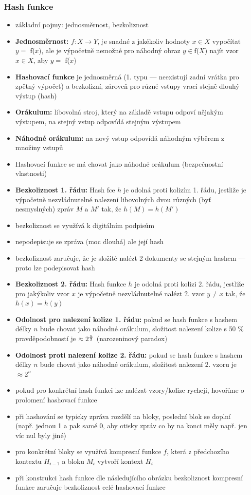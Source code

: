 \subsubsection*{Hash funkce}
\begin{itemize}
	\item základní pojmy: jednosměrnost, bezkoliznost
	\item \textbf{Jednosměrnost:} $f: X \rightarrow Y$, je snadné z jakékoliv hodnoty $x \in X$ vypočítat $y = $ f($x$), ale je výpočetně nemožné pro náhodný obraz $y \in $f($X$) najít vzor $x \in X$, aby $y = $ f($x$)
	\item \textbf{Hashovací funkce} je jednosměrná (1. typu --- neexistují zadní vrátka pro zpětný výpočet) a bezkolizní, zároveň pro různé vstupy vrací stejně dlouhý výstup (hash)
	\item \textbf{Orákulum:} libovolná stroj, který na základě vstupu odpoví nějakým výstupem, na stejný vstup odpovídá stejným výstupem
	\item \textbf{Náhodné orákulum:} na nový vstup odpovídá náhodným výběrem z množiny vstupů
	\item Hashovací funkce se má chovat jako náhodné orákulum (bezpečnostní vlastnosti)
	\item \textbf{Bezkoliznost 1. řádu:} Hash fce $h$ je odolná proti kolizím 1. řádu, jestliže je výpočetně nezvládnutelné nalezení libovolných dvou různých (byť nesmyslných) zpráv $M$ a $M'$ tak, že $h(M) = h(M')$
	\item bezkoliznost se využívá k digitálním podpisům
	\item nepodepisuje se zpráva (moc dlouhá) ale její hash
	\item bezkoliznost zaručuje, že je složité nalézt 2 dokumenty se stejným hashem --- proto lze podepisovat hash
	\item \textbf{Bezkoliznost 2. řádu:} Hash funkce $h$ je odolná proti kolizi 2. řádu, jestliže pro jakýkoliv vzor $x$ je výpočetně nezvládnutelné nalézt 2. vzor $y \neq x$ tak, že  $h(x) = h(y)$
	\item \textbf{Odolnost pro nalezení kolize 1. řádu:} pokud se hash funkce s hashem délky $n$ bude chovat jako náhodné orákulum, složitost nalezení kolize s 50 \% pravděpodobností je $\approx 2^{n \over 2}$ (narozeninový paradox)
	\item \textbf{Odolnost proti nalezení kolize 2. řádu:} pokud se hash funkce s hashem délky $n$ bude chovat jako náhodné orákulum, složitost nalezení 2. vzoru je $\approx 2^{n}$
	\item pokud pro konkrétní hash funkci lze nalézat vzory/kolize rycheji, hovoříme o prolomení hashovací funkce
	\item při hashování se typicky zpráva rozdělí na bloky, poslední blok se doplní (např. jednou 1 a pak samé 0, aby otisky zpráv co by na konci měly např. jen víc nul byly jiné)
	\item pro konkrétní bloky se využívá kompresní funkce $f$, která z předchozího kontextu $H_{i-1}$ a bloku $M_i$ vytvoří kontext $H_i$
	\item při konstrukci hash funkce dle následujícího obrázku bezkoliznost kompresní funkce zaručuje bezkoliznost celé hashovací funkce
\end{itemize}

